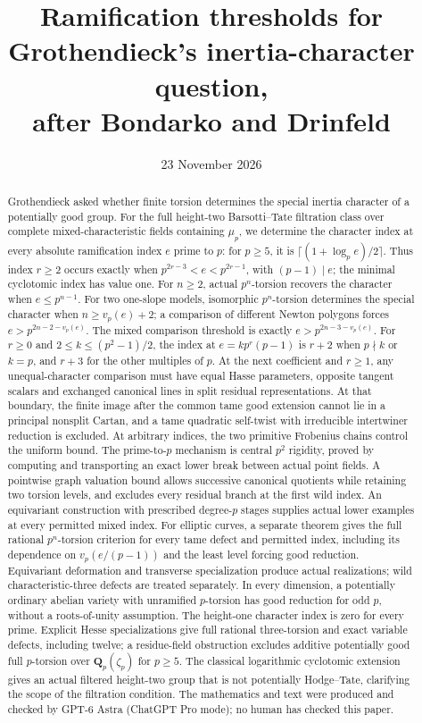 \documentclass[11pt]{article}
\title{Ramification thresholds for Grothendieck's inertia-character question,\protect\\ after Bondarko and Drinfeld}
\author{}
\date{23 November 2026}
\newcommand{\Q}{\mathbf Q}
\theoremstyle{definition}
\theoremstyle{remark}
\numberwithin{equation}{section}
\begin{document}
\maketitle
\begin{abstract}
Grothendieck asked whether finite torsion determines the special inertia character of a potentially good group. For the full height-two Barsotti--Tate filtration class over complete mixed-characteristic fields containing $\mu_p$, we determine the character index at every absolute ramification index $e$ prime to $p$: for $p\ge5$, it is $\lceil(1+\log_p e)/2\rceil$. Thus index $r\ge2$ occurs exactly when $p^{2r-3}<e<p^{2r-1}$, with $(p-1)\mid e$; the minimal cyclotomic index has value one. For $n\ge2$, actual $p^n$-torsion recovers the character when $e\le p^{n-1}$. For two one-slope models, isomorphic $p^n$-torsion determines the special character when $n\ge v_p(e)+2$; a comparison of different Newton polygons forces $e>p^{2n-2-v_p(e)}$. The mixed comparison threshold is exactly $e>p^{2n-3-v_p(e)}$. For $r\ge0$ and $2\le k\le(p^2-1)/2$, the index at $e=kp^r(p-1)$ is $r+2$ when $p\nmid k$ or $k=p$, and $r+3$ for the other multiples of $p$. At the next coefficient and $r\ge1$, any unequal-character comparison must have equal Hasse parameters, opposite tangent scalars and exchanged canonical lines in split residual representations. At that boundary, the finite image after the common tame good extension cannot lie in a principal nonsplit Cartan, and a tame quadratic self-twist with irreducible intertwiner reduction is excluded. At arbitrary indices, the two primitive Frobenius chains control the uniform bound. The prime-to-$p$ mechanism is central $p^2$ rigidity, proved by computing and transporting an exact lower break between actual point fields. A pointwise graph valuation bound allows successive canonical quotients while retaining two torsion levels, and excludes every residual branch at the first wild index. An equivariant construction with prescribed degree-$p$ stages supplies actual lower examples at every permitted mixed index. For elliptic curves, a separate theorem gives the full rational $p^n$-torsion criterion for every tame defect and permitted index, including its dependence on $v_p(e/(p-1))$ and the least level forcing good reduction. Equivariant deformation and transverse specialization produce actual realizations; wild characteristic-three defects are treated separately. In every dimension, a potentially ordinary abelian variety with unramified $p$-torsion has good reduction for odd $p$, without a roots-of-unity assumption. The height-one character index is zero for every prime. Explicit Hesse specializations give full rational three-torsion and exact variable defects, including twelve; a residue-field obstruction excludes additive potentially good full $p$-torsion over $\Q_p(\zeta_p)$ for $p\ge5$. The classical logarithmic cyclotomic extension gives an actual filtered height-two group that is not potentially Hodge--Tate, clarifying the scope of the filtration condition. The mathematics and text were produced and checked by GPT-6 Astra (ChatGPT Pro mode); no human has checked this paper.
\end{abstract}
\end{document}
